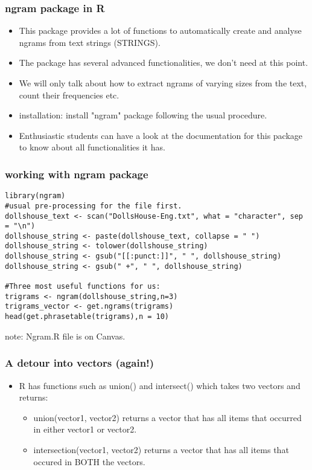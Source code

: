 \documentclass{beamer}
\begin{document}
\begin{frame}
\frametitle{ngram package in R}
\begin{itemize}
\item This package provides a lot of functions to automatically create and analyse ngrams from text strings (STRINGS).
\item The package has several advanced functionalities, we don't need at this point.
\item We will only talk about how to extract ngrams of varying sizes from the text, count their frequencies etc. 
\item installation: install "ngram" package following the usual procedure.
\item Enthusiastic students can have a look at the documentation for this package to know about all functionalities it has.
\end{itemize}
\end{frame}

\begin{frame}[fragile]
\frametitle{working with ngram package}
\scriptsize
\begin{verbatim}
library(ngram)
#usual pre-processing for the file first.
dollshouse_text <- scan("DollsHouse-Eng.txt", what = "character", sep = "\n")
dollshouse_string <- paste(dollshouse_text, collapse = " ")
dollshouse_string <- tolower(dollshouse_string)
dollshouse_string <- gsub("[[:punct:]]", " ", dollshouse_string)
dollshouse_string <- gsub(" +", " ", dollshouse_string)

#Three most useful functions for us:
trigrams <- ngram(dollshouse_string,n=3)
trigrams_vector <- get.ngrams(trigrams)
head(get.phrasetable(trigrams),n = 10)
\end{verbatim}
note: Ngram.R file is on Canvas.
\end{frame}

\begin{frame}
\frametitle{A detour into vectors (again!)}
\begin{itemize}
\item R has functions such as union() and intersect() which takes two vectors and returns:
\begin{itemize}
\item union(vector1, vector2) returns a vector that has all items that occurred in either vector1 or vector2.
\item intersection(vector1, vector2) returns a vector that has all items that occured in BOTH the vectors.
\end{itemize}
\end{itemize}
\end{frame}
\end{document}
